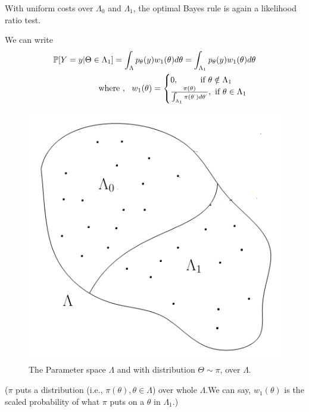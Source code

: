 \documentclass[12pt]{report}
\begin{document}
\begin{rem}
 With uniform costs over $\Lambda_0$ and $\Lambda_1$, the optimal Bayes rule is again a likelihood ratio test.\\
\end{rem}

\begin{rem}
We can write
\begin{align*}
\mathbb{P}[{Y=y}|{\Theta\in\Lambda_1}]=\int_{\Lambda} p_{\theta}(y)w_1({\theta})d\theta=\int_{\Lambda_1}p_{\theta}(y)w_1({\theta})d\theta\\
\text {where },~~w_1(\theta)=
\begin{cases}
0,~~~~~~~~\text{if}~ \theta\notin\Lambda_1\\
\frac{\pi(\theta)}{\int_{\Lambda_1} \pi({\theta^`})d\theta^`},~\text{if}~ \theta\in\Lambda_1\\
\end{cases}
\end{align*}

\begin{figure}[h]
\centering
\includegraphics[scale=0.6]{Figures/Lambdaparameterspace.png}
\caption{The Parameter space $\Lambda$ and with distribution $\Theta\sim\pi$, over $\Lambda$.}
\label{fig:pionlambda}
\end{figure}

(\noindent $\pi$ puts a distribution (i.e., $\pi(\theta),\theta\in\Lambda$) over whole $\Lambda$.We can say, $w_1(\theta)$ is the scaled probability of what $\pi$ puts on a $\theta$ in $\Lambda_1$.)
\end{rem}
\end{document}
